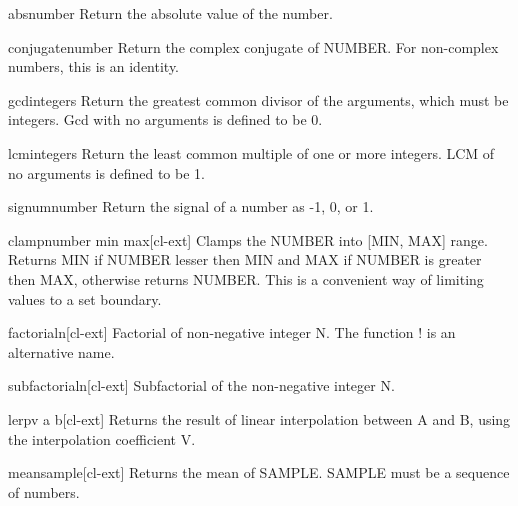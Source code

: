 \documentclass[10pt,english]{book}
\begin{document}
\begin{function}{abs}{number}
  Return the absolute value of the number.
\end{function}

\begin{function}{conjugate}{number}
  Return the complex conjugate of NUMBER. For non-complex numbers, this is
  an identity.
\end{function}

\begin{function}{gcd}{\rest integers}
  Return the greatest common divisor of the arguments, which must be
  integers. Gcd with no arguments is defined to be 0.
\end{function}

\begin{function}{lcm}{\rest integers}
  Return the least common multiple of one or more integers. LCM of no
  arguments is defined to be 1.
\end{function}

\begin{function}{signum}{number}
  Return the signal of a number as -1, 0, or 1.
\end{function}

\begin{function}{clamp}{number min max}[cl-ext]
  Clamps the NUMBER into [MIN, MAX] range. Returns MIN if NUMBER
  lesser then MIN and MAX if NUMBER is greater then MAX, otherwise
  returns NUMBER. This is a convenient way of limiting values to a set
  boundary.
\end{function}

\begin{function}{factorial}{n}[cl-ext]
  Factorial of non-negative integer N. The function ! is an
  alternative name.
\end{function}

\begin{function}{subfactorial}{n}[cl-ext]
  Subfactorial of the non-negative integer N.
\end{function}

\begin{function}{lerp}{v a b}[cl-ext]
  Returns the result of linear interpolation between A and B, using the
interpolation coefficient V.
\end{function}

\begin{function}{mean}{sample}[cl-ext]
  Returns the mean of SAMPLE. SAMPLE must be a sequence of numbers.
\end{function}
\end{document}

